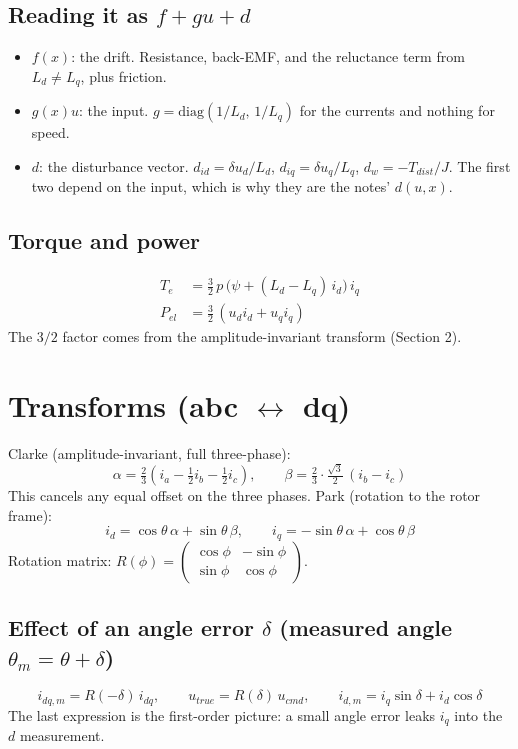 \documentclass[11pt]{article}
\begin{document}
\subsection*{Reading it as $f + gu + d$}
\begin{itemize}
\item $f(x)$: the drift. Resistance, back-EMF, and the reluctance term from $L_d \neq L_q$, plus friction.
\item $g(x)u$: the input. $g = \mathrm{diag}(1/L_d,\, 1/L_q)$ for the currents and nothing for speed.
\item $d$: the disturbance vector. $d_{id} = \delta u_d / L_d$, $d_{iq} = \delta u_q/L_q$, $d_w = -T_{dist}/J$. The first two depend on the input, which is why they are the notes' $d(u,x)$.
\end{itemize}

\subsection*{Torque and power}
\begin{align}
T_e &= \tfrac{3}{2}\,p\,\big(\psi + (L_d - L_q)\, i_d\big)\, i_q\\
P_{el} &= \tfrac{3}{2}\,(u_d i_d + u_q i_q)
\end{align}
The $3/2$ factor comes from the amplitude-invariant transform (Section 2).

\section{Transforms (abc $\leftrightarrow$ dq)}
Clarke (amplitude-invariant, full three-phase):
\begin{equation}
\alpha = \tfrac{2}{3}\left(i_a - \tfrac{1}{2} i_b - \tfrac{1}{2} i_c\right), \qquad
\beta = \tfrac{2}{3}\cdot\tfrac{\sqrt{3}}{2}\,(i_b - i_c)
\end{equation}
This cancels any equal offset on the three phases. Park (rotation to the rotor frame):
\begin{equation}
i_d = \cos\theta\,\alpha + \sin\theta\,\beta, \qquad i_q = -\sin\theta\,\alpha + \cos\theta\,\beta
\end{equation}
Rotation matrix: $R(\phi) = \begin{pmatrix}\cos\phi & -\sin\phi\\ \sin\phi & \cos\phi\end{pmatrix}$.

\subsection*{Effect of an angle error $\delta$ (measured angle $\theta_m = \theta + \delta$)}
\begin{equation}
i_{dq,m} = R(-\delta)\, i_{dq}, \qquad u_{true} = R(\delta)\, u_{cmd}, \qquad i_{d,m} = i_q \sin\delta + i_d\cos\delta
\end{equation}
The last expression is the first-order picture: a small angle error leaks $i_q$ into the $d$ measurement.
\end{document}
